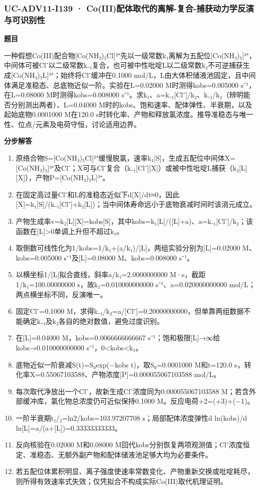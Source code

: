 \documentclass[UTF8,11pt,a4paper]{ctexart}
\begin{document}
\subsubsection*{UC-ADV11-I139 · Co(III)配体取代的离解-复合-捕获动力学反演与可识别性}
\noindent\textbf{题目}\par
一种假想Co(III)配合物[Co(NH₃)₅Cl]²⁺先以一级常数k₁离解为五配位[Co(NH₃)₅]³⁺，中间体可被Cl⁻以二级常数k₋₁复合，也可被中性吡啶L以二级常数k₂不可逆捕获生成[Co(NH₃)₅L]³⁺；始终将Cl⁻缓冲在0.1000 mol/L，L由大体积储液池固定，且中间体满足准稳态、总底物近似一阶。实验在L=0.02000 M时测得kobs=0.005000 s⁻¹，在L=0.08000 M时测得kobs=0.008000 s⁻¹。求k₁、a=k₋₁[Cl⁻]/k₂、k₋₁/k₂（辨明能否分别测出两者）、L=0.04000 M时的kobs、饱和速率、配体弹性、半衰期，以及起始底物0.0001000 M在120.0 s时转化率、产物和释放氯浓度。推导准稳态与唯一性、位点/元素及电荷守恒，讨论适用边界。\par
\medskip\noindent\textbf{分步解答}
\begin{enumerate}
\item 原络合物S=[Co(NH₃)₅Cl]²⁺缓慢脱氯，速率k₁[S]，生成五配位中间体X=[Co(NH₃)₅]³⁺及Cl⁻；X可与Cl⁻复合（k₋₁[Cl⁻][X]）或被中性吡啶L捕获（k₂[L][X]），产物P=[Co(NH₃)₅L]³⁺。
\item 在固定高过量Cl⁻和L的准稳态近似下d[X]/dt≈0，因此[X]=k₁[S]/(k₋₁[Cl⁻]+k₂[L])；当中间体寿命远小于底物衰减时间时该消元成立。
\item 产物生成率v=k₂[L][X]=kobs[S]，其中kobs=k₁[L]/([L]+a)、a=k₋₁[Cl⁻]/k₂；该函数在[L]>0单调上升但不超过k₁。
\item 取倒数可线性化为1/kobs=1/k₁+(a/k₁)/[L]，两组实验分别为[L]=0.02000 M、kobs=0.005000 s⁻¹及[L]=0.08000 M、kobs=0.008000 s⁻¹。
\item 以横坐标1/[L]拟合直线，斜率a/k₁=2.0000000000 M·s，截距1/k₁=100.00000000 s，故k₁=0.010000000000 s⁻¹、a=0.020000000000 mol/L；两点横坐标不同，反演唯一。
\item 固定Cl⁻=0.1000 M，求得k₋₁/k₂=a/[Cl⁻]=0.20000000000，但单靠两组数据不能确定k₋₁及k₂各自的绝对数值，避免过度识别。
\item 在[L]=0.04000 M，kobs=0.0066666666667 s⁻¹；饱和极限[L]→∞给kobs→0.010000000000 s⁻¹，0<kobs<k₁。
\item 底物近似一阶衰减S(t)=S₀exp(−kobs t)，取S₀=0.0001000 M和t=120.0 s，转化率X=0.55067103588、产物浓度[P]=0.000055067103588 mol/L。
\item 每次取代净放出一个Cl⁻，故新生成Cl⁻浓度同为0.000055067103588 M；若含外部缓冲库，氯化物总浓度仍可近似保持0.1000 M。反应电荷+2=(+3)+(−1)。
\item 一阶半衰期t₁/₂=ln2/kobs=103.97207708 s；局部配体浓度弹性d ln(kobs)/d ln[L]=a/(a+[L])=0.33333333333。
\item 反向核验在0.02000 M和0.08000 M回代kobs分别恢复两项观测值；Cl⁻浓度恒定、准稳态、无额外副产物和配体储液池足够大均为必要条件。
\item 若五配位体累积明显、离子强度使速率常数变化、产物重新交换或吡啶耗尽，则所得有效速率式失效；仅凭拟合不构成实际Co(III)取代机理证明。
\end{enumerate}
\end{document}
